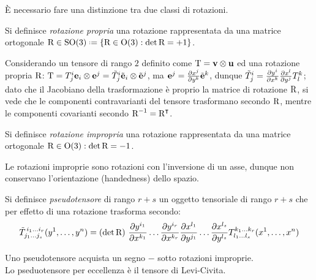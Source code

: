 È necessario fare una distinzione tra due classi di rotazioni.

\begin{definition}
	Si definisce \textit{rotazione propria} una rotazione rappresentata da una matrice ortogonale $ \tens{R} \in \SOt \defeq \{\tens{R} \in \Ot : \det\tens{R} = +1 \} $.
\end{definition}

\begin{example}
	Considerando un tensore di rango $ 2 $ definito come $ \mathbf{\text{T}} = \mathbf{v} \otimes \mathbf{u} $ ed una rotazione propria $ \mathbf{\text{R}} $: $ \mathbf{\text{T}} = T^i_j \mathbf{e}_i \otimes \mathbf{e}^j = \tilde{T}^i_j \tilde{\mathbf{e}}_i \otimes \tilde{\mathbf{e}}^j $, ma $ \mathbf{e}^j = \frac{\partial x^j}{\partial y^k} \tilde{\mathbf{e}}^k $, dunque $ \tilde{T}^i_j = \frac{\partial y^i}{\partial x^k} \frac{\partial x^l}{\partial y^j} T^k_l $; dato che il Jacobiano della trasformazione è proprio la matrice di rotazione $ \mathbf{\text{R}} $, si vede che le componenti contravarianti del tensore trasformano secondo $ \mathbf{\text{R}} $, mentre le componenti covarianti secondo $ \mathbf{\text{R}}^{-1} = \mathbf{\text{R}}^{\intercal} $.
\end{example}

\begin{definition}
	Si definisce \textit{rotazione impropria} una rotazione rappresentata da una matrice ortogonale $ \mathbf{\text{R}} \in \text{O}(3) : \det\mathbf{\text{R}} = -1 $.
\end{definition}

Le rotazioni improprie sono rotazioni con l'inversione di un asse, dunque non conservano l'orientazione (handedness) dello spazio.

\begin{definition}
	Si definisce \textit{pseudotensore} di rango $ r+s $ un oggetto tensoriale di rango $ r+s $ che per effetto di una rotazione trasforma secondo:
	\begin{equation}
		\tilde{T}^{\,i_1 \dots i_r}_{j_1 \dots j_s} (y^1, \dots, y^n) = \left(\det\mathbf{\text{R}}\right)\, \frac{\partial y^{i_1}}{\partial x^{k_1}} \dots \frac{\partial y^{i_r}}{\partial x^{k_r}} \frac{\partial x^{l_1}}{\partial y^{j_1}} \dots \frac{\partial x^{l_s}}{\partial y^{l_s}} T^{k_1 \dots k_r}_{l_1 \dots l_s} (x^1, \dots, x^n)
		\label{eq:9}
	\end{equation}
\end{definition}

Uno pseudotensore acquista un segno $ - $ sotto rotazioni improprie. \\
Lo pseduotensore per eccellenza è il tensore di Levi-Civita.

